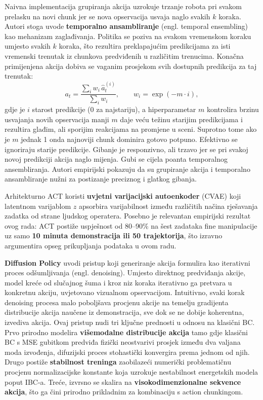 \documentclass[times, utf8, diplomski]{fer}
\begin{document}
Naivna implementacija grupiranja akcija uzrokuje trzanje robota pri svakom prelasku na novi chunk jer se nova opservacija usvaja naglo svakih $k$ koraka. Autori stoga uvode \textbf{temporalno ansambliranje} (engl. temporal ensembling) kao mehanizam zaglađivanja. Politika se poziva na svakom vremenskom koraku umjesto svakih $k$ koraka, što rezultira preklapajućim predikcijama za isti vremenski trenutak iz chunkova predviđenih u različitim trenucima. Konačna primijenjena akcija dobiva se vaganim prosjekom svih dostupnih predikcija za taj trenutak:
%
\begin{equation}
    a_t = \frac{\sum_{i} w_i \, \hat{a}_t^{(i)}}{\sum_{i} w_i}, \qquad w_i = \exp(-m \cdot i),
\end{equation}
%
gdje je $i$ starost predikcije (0 za najstariju), a hiperparametar $m$ kontrolira brzinu usvajanja novih opservacija manji $m$ daje veću težinu starijim predikcijama i rezultira glađim, ali sporijim reakcijama na promjene u sceni. Suprotno tome ako je $m$ jednak 1 onda najnoviji chunk dominira gotovo potpuno. Efektivno se ignoriraju starije predikcije. Gibanje je responzivno, ali trzavo jer se pri svakoj novoj predikciji akcija naglo mijenja. Gubi se cijela poanta temporalnog ansembliranja. Autori empirijski pokazuju da su grupiranje akcija i temporalno ansambliranje nužni za postizanje preciznog i glatkog gibanja.

Arhitekturno ACT koristi \textbf{uvjetni varijacijski autoenkoder} (CVAE) koji latentnom varijablom $z$ apsorbira varijabilnost između različitih načina rješavanja zadatka od strane ljudskog operatera. Posebno je relevantan empirijski rezultat ovog rada: ACT postiže uspješnost od 80--90\% na šest zadataka fine manipulacije uz samo \textbf{10 minuta demonstracija ili 50 trajektorija}, što izravno argumentira opseg prikupljanja podataka u ovom radu.

\textbf{Diffusion Policy} \cite{chi2023diffusionpolicy} uvodi pristup koji generiranje akcija formulira kao iterativni proces odšumljivanja (engl. denoising). Umjesto direktnog predviđanja akcije, model kreće od slučajnog šuma i kroz niz koraka iterativno ga pretvara u konkretnu akciju, uvjetovano vizualnom opservacijom. Intuitivno, svaki korak denoising procesa malo poboljšava procjenu akcije na temelju gradijenta distribucije akcija naučene iz demonstracija, sve dok se ne dobije koherentna, izvediva akcija. Ovaj pristup nudi tri ključne prednosti u odnosu na klasični BC. Prvo prirodno modelira \textbf{višemodalne distribucije akcija} tamo gdje klasični BC s MSE gubitkom predviđa fizički neostvarivi prosjek između dva valjana moda izvođenja, difuzijski proces stohastički konvergira prema jednom od njih. Drugo postiže \textbf{stabilnost treninga} zaobilazeći numerički problematičnu procjenu normalizacijske konstante koja uzrokuje nestabilnost energetskih modela poput IBC-a. Treće, izvrsno se skalira na \textbf{visokodimenzionalne sekvence akcija}, što ga čini prirodno prikladnim za kombinaciju s action chunkingom.
\end{document}
